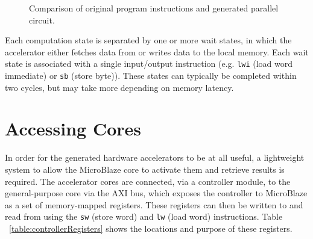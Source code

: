 \documentclass{UoYCSproject}
\begin{document}
\begin{figure}[H]
\caption{Comparison of original program instructions and generated parallel circuit.}
\label{fig:computationState}
\end{figure}

Each computation state is separated by one or more wait states, in which the accelerator either fetches data from or writes data
to the local memory. Each wait state is associated with a single input/output instruction
(e.g. \texttt{lwi} (load word immediate) or \texttt{sb} (store byte)). These states can typically be completed within two
cycles, but may take more depending on memory latency.

\section{Accessing Cores}

In order for the generated hardware accelerators to be at all useful, a lightweight system to allow the MicroBlaze core to
activate them and retrieve results is required. The accelerator cores are connected, via a controller module, to the
general-purpose core via the AXI bus, which exposes the controller to MicroBlaze as a set of memory-mapped registers.
These registers can then be written to and read from using the \texttt{sw} (store word) and \texttt{lw} (load word) instructions.
Table ~\ref{table:controllerRegisters} shows the locations and purpose of these registers.
\end{document}
